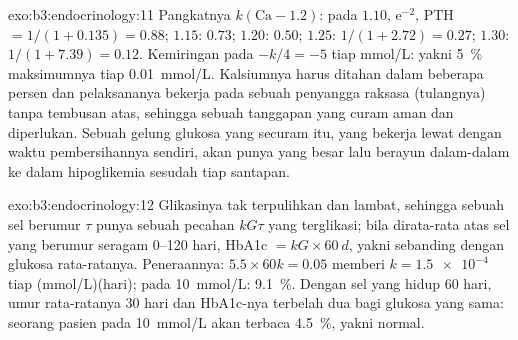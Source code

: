 \begin{solution}{exo:b3:endocrinology:11}
Pangkatnya $k(\text{Ca} - 1.2)$: pada $1.10$, $\mathrm{e}^{-2}$, PTH $= 1/
(1 + 0.135) = 0.88$; $1.15$: $0.73$; $1.20$: $0.50$; $1.25$: $1/(1 +
2.72) = 0.27$; $1.30$: $1/(1 + 7.39) = 0.12$. Kemiringan pada 
$-k/4 = -5$ tiap mmol/L: yakni \qty{5}{\%} maksimumnya tiap
\qty{0.01}{mmol/L}. Kalsiumnya harus ditahan dalam beberapa persen dan
pelaksananya bekerja pada sebuah penyangga raksasa (tulangnya) tanpa tembusan atas, sehingga sebuah
tanggapan yang curam aman dan diperlukan. Sebuah gelung glukosa yang securam itu, yang bekerja lewat
 dengan waktu pembersihannya sendiri, akan punya  yang besar lalu
berayun dalam-dalam ke dalam hipoglikemia sesudah tiap santapan.
\end{solution}

\begin{solution}{exo:b3:endocrinology:12}
Glikasinya tak terpulihkan dan lambat, sehingga sebuah sel berumur $\tau$ punya
sebuah pecahan $kG\tau$ yang terglikasi; bila dirata-rata atas sel yang berumur seragam
\numrange{0}{120} hari, HbA1c $= kG\times\qty{60}{d}$, yakni sebanding
dengan glukosa rata-ratanya. Peneraannya: $5.5\times 60k = 0.05$ memberi $k =
\qty{1.5e-4}{}$ tiap (mmol/L)(hari); pada \qty{10}{mmol/L}: \qty{9.1}{\%}.
Dengan sel yang hidup 60 hari, umur rata-ratanya 30 hari dan HbA1c-nya
terbelah dua bagi glukosa yang sama: seorang pasien pada \qty{10}{mmol/L} akan terbaca
\qty{4.5}{\%}, yakni normal.
\end{solution}

